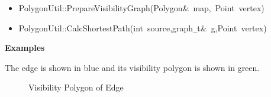 \begin{itemize}


\item

{
\noindent \ttfamily
\noindent \ttfamily
\noindent \ttfamily
\noindent \ttfamily
\jttstylek PolygonUtil::PrepareVisibilityGraph\jttstylei (\jttstylek Polygon\&~map,~Point~vertex\jttstylei [])\\

}


\item

{
\noindent \ttfamily
\jttstylek PolygonUtil::CalcShortestPath\jttstylei (\jttstylej int~\jttstylek source,graph\verb#_#t\&~g,Point~vertex\jttstylei [])\\
\noindent \ttfamily
}

\end{itemize}

{\bf Examples}

The edge is shown in blue and its visibility polygon is shown in green.

\begin{figure}[h]
\begin{center}
\caption{\label{fig:Visibility Polygon of Edge}Visibility Polygon of Edge}
\end{center}
\end{figure}

